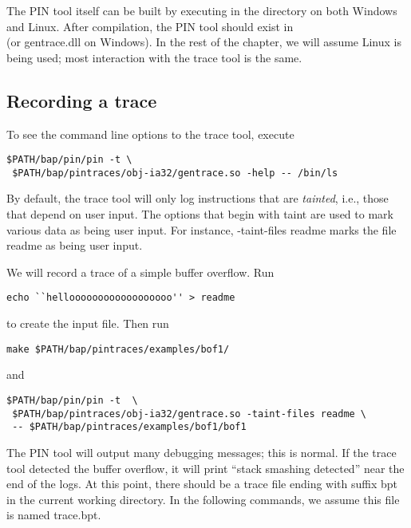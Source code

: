 The PIN tool itself can be built by executing  in the
 directory on both Windows and Linux.
After compilation, the PIN tool should exist in
\\  (or
gentrace.dll on Windows).  In the rest of the chapter, we will assume
Linux is being used; most interaction with the trace tool is the same.

\subsection{Recording a trace}

To see the command line options to the trace tool, execute 

\begin{verbatim} 
$PATH/bap/pin/pin -t \
 $PATH/bap/pintraces/obj-ia32/gentrace.so -help -- /bin/ls
\end{verbatim}

By default, the trace tool will only log instructions that are
\emph{tainted}, i.e., those that depend on user input.  The options
that begin with taint are used to mark various data
as being user input.  For instance, -taint-files readme marks the file
readme as being user input.

We will record a trace of a simple buffer overflow.  Run 

\begin{verbatim}
echo ``helloooooooooooooooooo'' > readme
\end{verbatim}

 to create the input file.  Then run 

\begin{verbatim}
make $PATH/bap/pintraces/examples/bof1/
\end{verbatim}

and

\begin{verbatim}
$PATH/bap/pin/pin -t  \
 $PATH/bap/pintraces/obj-ia32/gentrace.so -taint-files readme \
 -- $PATH/bap/pintraces/examples/bof1/bof1
\end{verbatim}

The PIN tool will output
many debugging messages; this is normal.  If the trace tool detected
the buffer overflow, it will print ``stack smashing detected'' near
the end of the logs.  At this point, there should be a trace file
ending with suffix bpt in the current working directory.  In the
following commands, we assume this file is named trace.bpt.

